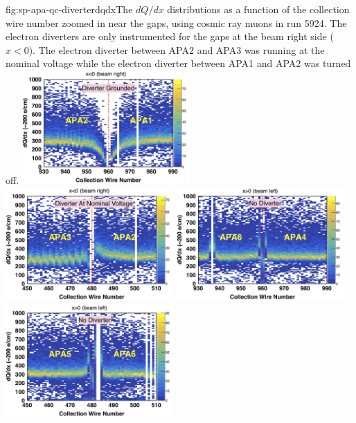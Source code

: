 \begin{dunefigure}{fig:sp-apa-qc-diverterdqdx}{The $dQ/dx$ distributions as a function of the collection wire number zoomed in near the gaps, using cosmic ray muons in  run 5924. The electron diverters are only instrumented for the gaps at the beam right side ($x<0$). The electron diverter between APA2 and APA3 was running at the nominal voltage while the electron diverter between APA1 and APA2 was turned off. }
\includegraphics[width=0.48\textwidth]{graphics/sp-apa-dQdxAPA12.png}
\includegraphics[width=0.48\textwidth]{graphics/sp-apa-dQdxAPA32.png}
\includegraphics[width=0.48\textwidth]{graphics/sp-apa-dQdxAPA46.png}
\includegraphics[width=0.48\textwidth]{graphics/sp-apa-dQdxAPA56.png}
\end{dunefigure}
    
